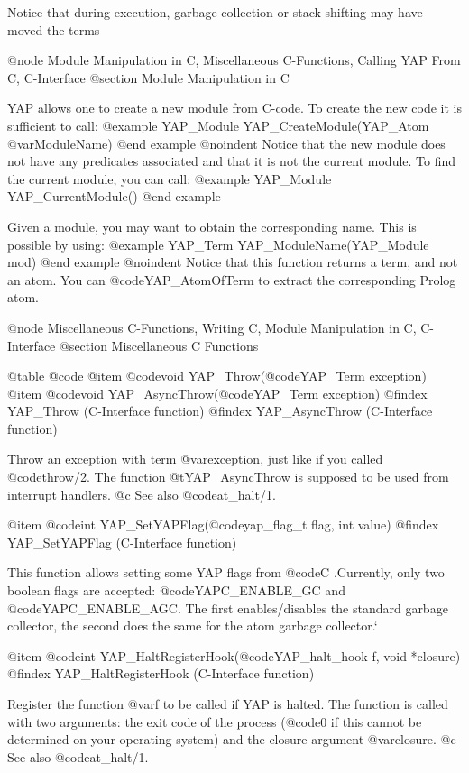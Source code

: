 {{{{{{{{{Notice that during execution, garbage collection or stack shifting may
have moved the terms 

@node Module Manipulation in C, Miscellaneous C-Functions, Calling YAP From C, C-Interface
@section Module Manipulation in C

YAP allows one to create a new module from C-code. To create the new
code it is sufficient to call:
@example
      YAP_Module      YAP_CreateModule(YAP_Atom @var{ModuleName})
@end example
@noindent
Notice that the new module does not have any predicates associated and
that it is not the current module. To find the current module, you can call:
@example
      YAP_Module      YAP_CurrentModule()
@end example

Given a module, you may want to obtain the corresponding name. This is
possible by using:
@example
      YAP_Term      YAP_ModuleName(YAP_Module mod)
@end example
@noindent
Notice that this function returns a term, and not an atom. You can
@code{YAP_AtomOfTerm} to extract the corresponding Prolog atom.

@node Miscellaneous C-Functions, Writing C, Module Manipulation in C, C-Interface
@section Miscellaneous C Functions

@table @code
@item  @code{void} YAP_Throw(@code{YAP_Term exception})
@item  @code{void} YAP_AsyncThrow(@code{YAP_Term exception})
@findex YAP_Throw (C-Interface function)
@findex YAP_AsyncThrow (C-Interface function)

Throw an exception with term  @var{exception}, just like if you called
@code{throw/2}. The function @t{YAP_AsyncThrow} is supposed to be used
from interrupt handlers.
@c See also @code{at_halt/1}.

@item  @code{int} YAP_SetYAPFlag(@code{yap_flag_t flag, int value})
@findex YAP_SetYAPFlag (C-Interface function)

This function allows setting some YAP flags from @code{C} .Currently,
only two boolean flags are accepted: @code{YAPC_ENABLE_GC} and
@code{YAPC_ENABLE_AGC}.  The first enables/disables the standard garbage
collector, the second does the same for the atom garbage collector.`

@item  @code{int} YAP_HaltRegisterHook(@code{YAP_halt_hook f, void *closure})
@findex YAP_HaltRegisterHook (C-Interface function)

Register the function @var{f} to be called if YAP is halted. The
function is called with two arguments: the exit code of the process (@code{0}
if this cannot be determined on your operating system) and the closure
argument @var{closure}. 
@c See also @code{at_halt/1}.

}}}}}}}}}
